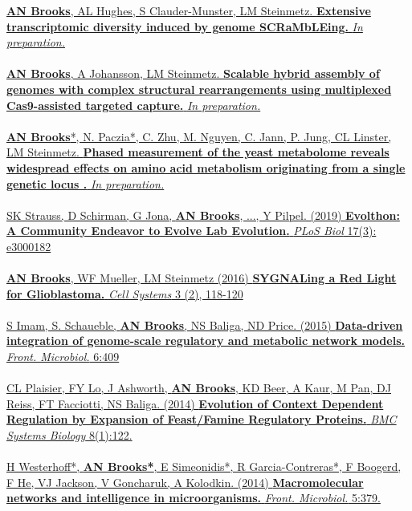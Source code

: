 \documentclass[usenames,dvipsnames]{friggeri-cv}
\begin{document}
\href{}{\noindent
\textbf{AN Brooks}, AL Hughes, S Clauder-Munster, LM Steinmetz.
\textbf{Extensive transcriptomic diversity induced by genome SCRaMbLEing.}
\emph{In preparation.}
}
\\
\\
\href{}{\noindent
\textbf{AN Brooks}, A Johansson, LM Steinmetz.
\textbf{Scalable hybrid assembly of genomes with complex structural rearrangements using multiplexed Cas9-assisted targeted capture.}
\emph{In preparation.}
}
\\
\\
\href{}{\noindent
\textbf{AN Brooks}*, N. Paczia*, C. Zhu, M. Nguyen, C. Jann, P. Jung, CL Linster, LM Steinmetz.
\textbf{Phased measurement of the yeast metabolome reveals widespread effects on amino acid metabolism originating from a single genetic locus .}
\emph{In preparation.}
}
\\
\\
\href{https://journals.plos.org/plosbiology/article?id=10.1371/journal.pbio.3000182}{\noindent
SK Strauss, D Schirman, G Jona, \textbf{AN Brooks}, ..., Y Pilpel. (2019)
\textbf{Evolthon: A Community Endeavor to Evolve Lab Evolution.}
\emph{PLoS Biol} 17(3): e3000182
}
\\
\\
\href{http://journal.frontiersin.org/article/10.3389/fmicb.2015.00409/abstract}{\noindent
\textbf{AN Brooks}, WF Mueller, LM Steinmetz (2016)
\textbf{SYGNALing a Red Light for Glioblastoma.}
\emph{Cell Systems}  3 (2), 118-120
}
\\
\\
\href{http://journal.frontiersin.org/article/10.3389/fmicb.2015.00409/abstract}{\noindent
S Imam, S. Schaueble,  \textbf{AN Brooks}, NS Baliga, ND Price. (2015)
\textbf{Data-driven integration of genome-scale regulatory and metabolic network models.}
\emph{Front. Microbiol.} 6:409
}
\\
\\
\href{http://www.biomedcentral.com/1752-0509/8/122}{\noindent
CL Plaisier, FY Lo, J Ashworth, \textbf{AN Brooks}, KD Beer, A Kaur, M Pan, DJ Reiss, FT Facciotti, NS Baliga. (2014)
\textbf{Evolution of Context Dependent Regulation by Expansion of Feast/Famine Regulatory Proteins.}
\emph{BMC Systems Biology} 8(1):122.
}
\\
\\
\href{http://journal.frontiersin.org/article/10.3389/fmicb.2014.00379/abstract}{\noindent
H Westerhoff*, \textbf{AN Brooks*}, E Simeonidis*, R Garcia-Contreras*, F Boogerd, F He, VJ Jackson, V Goncharuk, A Kolodkin. (2014)
\textbf{Macromolecular networks and intelligence in microorganisms.}
\emph{Front. Microbiol.} 5:379.
}
\end{document}
